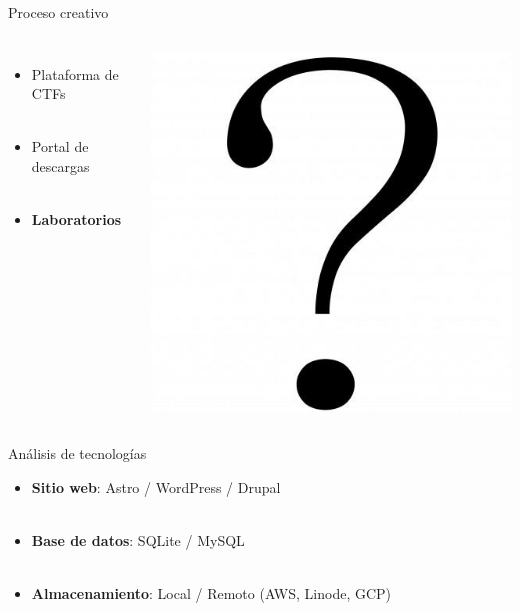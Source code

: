     \begin{frame}{Proceso creativo}
        \begin{columns}[c]
                \begin{itemize}
                    \item Plataforma de CTFs
                    \\~\\
                    \item Portal de descargas
                    \\~\\
                    \item \textbf{Laboratorios}
                \end{itemize}
            
                \includegraphics[scale=0.25]{images/interrogacion.png}
        \end{columns}
    \end{frame}

    \begin{frame}{Análisis de tecnologías}
        \begin{itemize}
            \item \textbf{Sitio web}: Astro / WordPress / Drupal
            \\~\\
            \item \textbf{Base de datos}: SQLite / MySQL
            \\~\\
            \item \textbf{Almacenamiento}: Local / Remoto (AWS, Linode, GCP) 
        \end{itemize}
    \end{frame}


